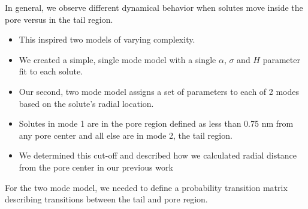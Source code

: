 \documentclass{article}
\begin{document}
  In general, we observe different dynamical behavior when solutes move inside the
  pore versus in the tail region.


  \begin{itemize}
    \item This inspired two models of varying complexity.
    \item We created a simple, single mode model with a single $\alpha$, $\sigma$ and $H$
    parameter fit to each solute.
    \item Our second, two mode model assigns a set of parameters to each of 2 modes based
    on the solute's radial location.
    \item Solutes in mode 1 are in the pore region defined as less than 0.75 nm from any
    pore center and all else are in mode 2, the tail region. 
    \item We determined this cut-off and described how we calculated radial 
    distance from the pore center in our previous work~\cite{coscia_chemically_2019}
  \end{itemize}
  
  For the two mode model, we needed to define a probability transition matrix 
  describing transitions between the tail and pore region. 

\end{document}

